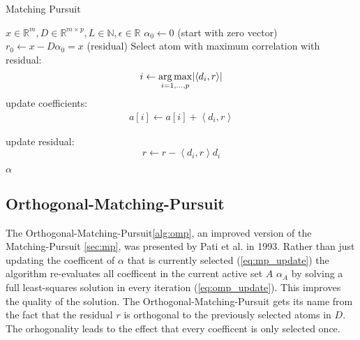 \begin{algorithm}
\caption{Matching Pursuit}
\label{alg:mp}
\begin{algorithmic}[1]
\REQUIRE $x \in \mathbb{R}^m, D \in \mathbb{R}^{m\times p}, L \in \mathbb{N}, \epsilon \in \mathbb{R}$
\STATE $\alpha_0 \gets 0$ (start with zero vector)
\STATE $r_0 \gets x-D\alpha_0 = x$ (residual) 
\STATE Select atom with maximum correlation with residual: 
\begin{equation*}
i \gets \operatorname*{arg\,max}_{i=1,...,p} \lvert \left<d_i,r\right> \rvert
\end{equation*}
\STATE update coefficients: 
\begin{align}
a[i]  \gets a[i] + \left<d_i,r\right> \label{eq:mp_update}
\end{align}

\STATE update residual:
\begin{equation*}
 r \gets r - \left<d_i,r\right>d_i
\end{equation*}

\ENDWHILE
\RETURN $\alpha$
\end{algorithmic}
\end{algorithm}
\subsection{Orthogonal-Matching-Pursuit}
\label{sec:omp}

The Orthogonal-Matching-Pursuit\ref{alg:omp}, an improved version of
the Matching-Pursuit \ref{sec:mp}, was presented by Pati et al.
in 1993\cite{Pati1993}. Rather than just updating the coefficent of $\alpha$
that is currently selected (\ref{eq:mp_update}) the algorithm re-evaluates
all coefficent in the current active set $A$ 
$\alpha_A$ by solving a full least-squares solution in every iteration
(\ref{eq:omp_update}). This improves the quality of the
solution.\cite{Pati1994} The Orthogonal-Matching-Pursuit gets its name from
the fact that the residual $r$ is orthogonal to the previously selected atoms in
$D$. The orhogonality leads to the effect that every coefficent is only selected
once.


